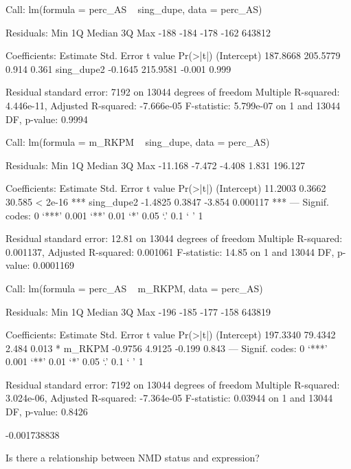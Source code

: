\documentclass{article}
\begin{document}
\begin{Schunk}
\begin{Soutput}
Call:
lm(formula = perc_AS ~ sing_dupe, data = perc_AS)

Residuals:
   Min     1Q Median     3Q    Max 
  -188   -184   -178   -162 643812 

Coefficients:
            Estimate Std. Error t value Pr(>|t|)
(Intercept) 187.8668   205.5779   0.914    0.361
sing_dupe2   -0.1645   215.9581  -0.001    0.999

Residual standard error: 7192 on 13044 degrees of freedom
Multiple R-squared:  4.446e-11,	Adjusted R-squared:  -7.666e-05 
F-statistic: 5.799e-07 on 1 and 13044 DF,  p-value: 0.9994
\end{Soutput}
\begin{Soutput}
Call:
lm(formula = m_RKPM ~ sing_dupe, data = perc_AS)

Residuals:
    Min      1Q  Median      3Q     Max 
-11.168  -7.472  -4.408   1.831 196.127 

Coefficients:
            Estimate Std. Error t value Pr(>|t|)    
(Intercept)  11.2003     0.3662  30.585  < 2e-16 ***
sing_dupe2   -1.4825     0.3847  -3.854 0.000117 ***
---
Signif. codes:  0 ‘***’ 0.001 ‘**’ 0.01 ‘*’ 0.05 ‘.’ 0.1 ‘ ’ 1

Residual standard error: 12.81 on 13044 degrees of freedom
Multiple R-squared:  0.001137,	Adjusted R-squared:  0.001061 
F-statistic: 14.85 on 1 and 13044 DF,  p-value: 0.0001169
\end{Soutput}
\begin{Soutput}
Call:
lm(formula = perc_AS ~ m_RKPM, data = perc_AS)

Residuals:
   Min     1Q Median     3Q    Max 
  -196   -185   -177   -158 643819 

Coefficients:
            Estimate Std. Error t value Pr(>|t|)  
(Intercept) 197.3340    79.4342   2.484    0.013 *
m_RKPM       -0.9756     4.9125  -0.199    0.843  
---
Signif. codes:  0 ‘***’ 0.001 ‘**’ 0.01 ‘*’ 0.05 ‘.’ 0.1 ‘ ’ 1

Residual standard error: 7192 on 13044 degrees of freedom
Multiple R-squared:  3.024e-06,	Adjusted R-squared:  -7.364e-05 
F-statistic: 0.03944 on 1 and 13044 DF,  p-value: 0.8426
\end{Soutput}
\begin{Soutput}
[1] -0.001738838
\end{Soutput}
\end{Schunk}

Is there a relationship between NMD status and expression?
\end{document}
